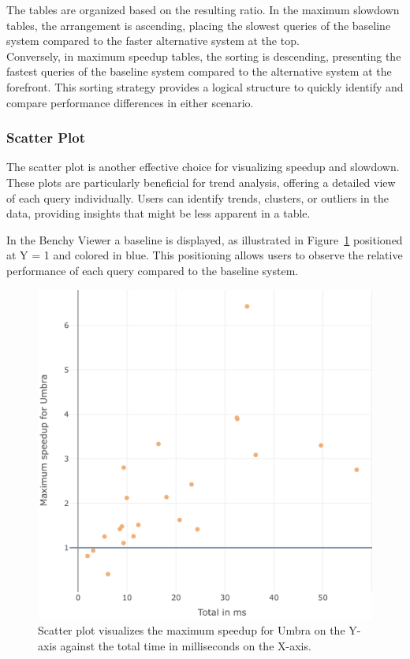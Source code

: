 The tables are organized based on the resulting ratio. In the maximum slowdown tables, the arrangement is ascending, placing the slowest queries of the baseline system compared to the faster alternative system at the top.\\
Conversely, in maximum speedup tables, the sorting is descending, presenting the fastest queries of the baseline system compared to the alternative system at the forefront. This sorting strategy provides a logical structure to quickly identify and compare performance differences in either scenario.


\subsubsection{Scatter Plot}

The scatter plot is another effective choice for visualizing speedup and slowdown. These plots are particularly beneficial for trend analysis, offering a detailed view of each query individually. Users can identify trends, clusters, or outliers in the data, providing insights that might be less apparent in a table.

In the Benchy Viewer a baseline is displayed, as illustrated in Figure~\ref{fig:scatter} positioned at Y = 1 and colored in blue. This positioning allows users to observe the relative performance of each query compared to the baseline system.

\begin{figure}[h]
  \centering
  \includegraphics[width=0.7\linewidth]{figures/bsp-scatter.png}
  \caption{Scatter plot visualizes the maximum speedup for Umbra on the Y-axis against the total time in milliseconds on the X-axis.}
  \label{fig:scatter}
\end{figure}

